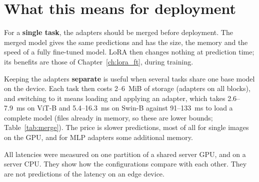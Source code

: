 \section{What this means for deployment}

For a \textbf{single task}, the adapters should be merged before deployment. The merged model gives the same
predictions and has the size, the memory and the speed of a fully fine-tuned model. LoRA then changes nothing at
prediction time; its benefits are those of Chapter~\ref{ch:lora_ft}, during training.

Keeping the adapters \textbf{separate} is useful when several tasks share one base model on the device. Each task
then costs 2--6~MiB of storage (adapters on all blocks), and switching to it means loading and applying an adapter, which takes 2.6--7.9~ms on
ViT-B and 5.4--16.3~ms on Swin-B against 91--133~ms to load a complete model (files already in memory, so these are
lower bounds; Table~\ref{tab:merge}). The price is slower predictions, most of all for single images on the GPU,
and for MLP adapters some additional memory.

All latencies were measured on one partition of a shared server GPU, and on a server CPU. They show how the
configurations compare with each other. They are not predictions of the latency on an edge device.
